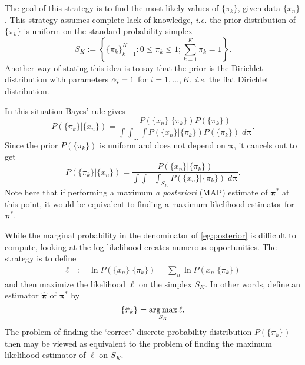 The goal of this strategy is to find the most likely values of $\{\pi_k\}$, given data $\{x_n\}$. This strategy assumes complete lack of knowledge, \textit{i.e.} the prior distribution of $\{\pi_k\}$ is uniform on the standard probability simplex 
\begin{equation}\label{simplexDef}
	S_K:=\left\{\{\pi_k\}_{k=1}^{K}:0\leq \pi_k\leq 1; \sum_{k=1}^{K}\pi_k =1\right\}.
\end{equation}
Another way of stating this idea is to say that the prior is the Dirichlet distribution with parameters \( \alpha_i = 1 \) for \( i=1,\ldots,K \), \textit{i.e.} the flat Dirichlet distribution.

In this situation Bayes' rule gives
\[P(\{\pi_k\}|\{x_n\})=\frac{P(\{x_n\}|\{\pi_k\})P(\{\pi_k\})}{\int\int_{\ldots}\int P(\{x_n\}|\{\pi_k\})P(\{\pi_k\})\; d\bm\pi}.\]
Since the prior $P(\{\pi_k\})$ is uniform and does not depend on \( \bm \pi \), it cancels out to get
\begin{equation}\label{eg:posterior}
 P(\{\pi_k\}|\{x_n\})=\frac{P(\{x_n\}|\{\pi_k\})}{\int\int_{\ldots}\int_{S_K} P(\{x_n\}|\{\pi_k\})\; d\bm\pi}.
\end{equation}
Note here that if performing a maximum \textit{a posteriori} (MAP) estimate of \( \bm\pi^{\ast} \) at this point, it would be equivalent to finding a maximum likelihood estimator for $\bm\pi^\ast$.

While the marginal probability in the denominator of \ref{eg:posterior} is difficult to compute, looking at the log likelihood creates numerous opportunities.  The strategy is to define
\begin{align}\label{eqn:ObjFunc}
\ell&:= \ln P(\{x_n\}|\{\pi_k\}) = \sum_n \ln P(x_n|\{\pi_k\})
\end{align}
and then maximize the likelihood \(\ell \) on the simplex $S_K$.
In other words, define an estimator \( \hat{\bm \pi} \) of \( \bm\pi^{\ast} \) by
\[\{\hat{\pi}_k\}=\operatorname*{arg\,max}_{S_K} \ell.\]
The problem of finding the `correct' discrete probability distribution $P(\{\pi_k\})$ then may be viewed as equivalent to the problem of finding the maximum likelihood estimator of $\ell$ on \( S_K \).  


